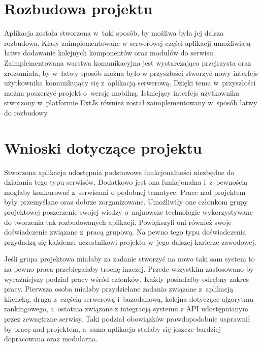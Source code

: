 \section{Rozbudowa projektu}

Aplikacja została stworzona w~taki sposób, by możliwa była jej dalsza rozbudowa. Klasy zaimplementowane w serwerowej części aplikacji umożliwiają łatwe dodawanie kolejnych komponentów oraz modułów do serwisu. Zaimplementowana warstwa komunikacyjna jest wystarczająco przejrzysta oraz zrozumiała, by w~łatwy sposób można było w przyszłości stworzyć nowy interfejs użytkownika komunikujący się z~aplikacją serwerową. Dzięki temu w~przyszłości można poszerzyć projekt o~wersję mobilną.
Istniejący interfejs użytkownika stworzony w~platformie ExtJs również został zaimplementowany w~sposób łatwy do rozbudowy.

\section{Wnioski dotyczące projektu}

Stworzona aplikacja udostępnia podstawowe funkcjonalności niezbędne do działania tego typu serwisów. Dodatkowo jest ona funkcjonalna i~z~pewnością mogłaby konkurować z~serwisami o podobnej tematyce. 
Prace nad projektem były przemyślane oraz dobrze zorganizowane. Umożliwiły one członkom grupy projektowej poszerzenie swojej wiedzy o~najnowsze technologie wykorzystywane do tworzenia tak rozbudowanych aplikacji. Powiększyli oni również swoje doświadczenie związane z~pracą grupową. 
Na pewno tego typu doświadczenia przydadzą się każdemu uczestnikowi projektu w~jego dalszej karierze zawodowej.

Jeśli grupa projektowa miałaby za zadanie stworzyć na nowo taki sam system to na pewno praca przebiegałaby trochę inaczej. Przede wszystkim zastosowano by wyraźniejszy podział pracy wśród członków. Każdy posiadałby odrębny zakres pracy. Pierwsza osoba miałaby przydzielane zadania związane z~aplikacją kliencką, druga z~częścią serwerową i~bazodanową, kolejna dotyczące algorytmu rankingowego, a~ostatnia związane z integracją systemu z API udostępnianym przez zewnętrzne serwisy. Taki podział obowiązków prawdopodobnie usprawnił by pracę nad projektem, a~sama aplikacja stałaby się jeszcze bardziej dopracowana oraz modularna. 